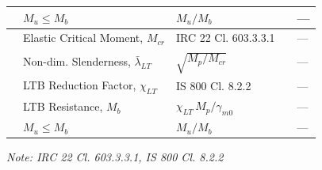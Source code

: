 \documentclass[12pt,a4paper]{report}
\numberwithin{table}{chapter}
\numberwithin{figure}{chapter}
\newcommand{\reportrowpad}{4pt}
\begin{document}
\begin{longtable}{|C{2.5cm}|C{3.5cm}|C{3.5cm}|>{\centering\arraybackslash}p{4.2cm}|C{1.8cm}|}
 & $M_u \leq M_b$ & $M_u / M_b$ &  & --- \\[\reportrowpad]
\hline
{} & Elastic Critical Moment, $M_{cr}$ & IRC 22 Cl. 603.3.3.1 &  & --- \\[\reportrowpad]
 & Non-dim. Slenderness, $\bar{\lambda}_{LT}$ & $\sqrt{M_p / M_{cr}}$ &  & --- \\[\reportrowpad]
 & LTB Reduction Factor, $\chi_{LT}$ & IS 800 Cl. 8.2.2 &  & --- \\[\reportrowpad]
 & LTB Resistance, $M_b$ & $\chi_{LT}\,M_p / \gamma_{m0}$ &  & --- \\[\reportrowpad]
 & $M_u \leq M_b$ & $M_u / M_b$ &  & --- \\[\reportrowpad]
\hline
\end{longtable}
\noindent\textit{Note: IRC 22 Cl. 603.3.3.1, IS 800 Cl. 8.2.2}
\end{document}
